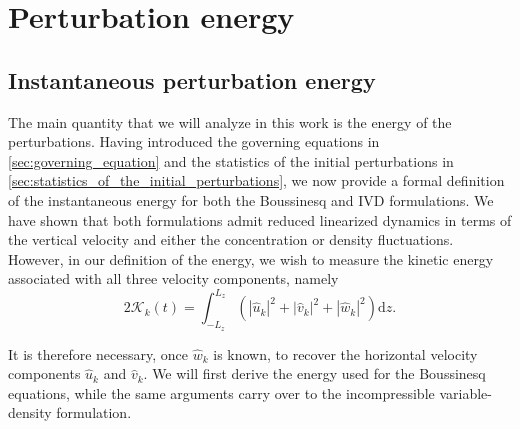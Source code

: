 \section{Perturbation energy}
\label{sec:perturbation_energy}

\subsection{Instantaneous perturbation energy}
\label{subsec:instantaneous_perturbation_energy}

The main quantity that we will analyze in this work is the energy of the perturbations. Having introduced the governing equations in \cref{sec:governing_equation} and the statistics of the initial perturbations in \cref{sec:statistics_of_the_initial_perturbations}, we now provide a formal definition of the instantaneous energy for both the Boussinesq and IVD formulations. We have shown that both formulations admit reduced linearized dynamics in terms of the vertical velocity and either the concentration or density fluctuations. However, in our definition of the energy, we wish to measure the kinetic energy associated with all three velocity components, namely
\begin{equation}
    \label{eq:bq_kinetic_energy_dz_k}
    2\mathcal{K}_k(t) = \int_{-L_z}^{L_z}\left(|\hat{u}_k|^{2}+|\hat{v}_k|^{2}+|\hat{w}_k|^{2}\right)\mathrm{d}z.
\end{equation}

It is therefore necessary, once \(\hat{w}_k\) is known, to recover the horizontal velocity components \(\hat{u}_k\) and \(\hat{v}_k\). We will first derive the energy used for the Boussinesq equations, while the same arguments carry over to the incompressible variable-density formulation.

